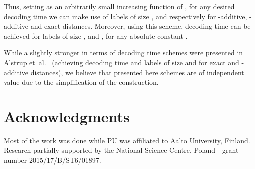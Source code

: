 \documentclass{article}[11pt,letter]
\newcommand{\etal}{{et~al.}\xspace}
\begin{document}
Thus, setting  as an arbitrarily small increasing function of , for any desired decoding time  we can make use of labels of size ,  and  respectively for -additive, -additive and exact distances. Moreover, using this scheme,  decoding time can be achieved for labels of size ,  and , for any absolute constant .

While a slightly stronger in terms of decoding time schemes were presented in  Alstrup \etal~\cite{DBLP:conf/soda/AlstrupGHP16} (achieving  decoding time and labels of size  and  for exact and -additive distances), we believe that presented here schemes are of independent value due to the simplification of the construction.







\section*{Acknowledgments}
Most of the work was done while PU was affiliated to Aalto University, Finland.
Research partially supported by the National Science Centre, Poland - grant number 2015/17/B/ST6/01897.



\end{document}
